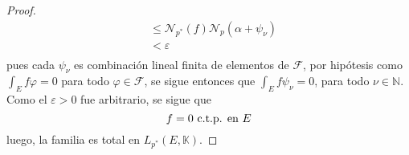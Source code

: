 \documentclass[12pt]{report}
\newcounter{it}
\theoremstyle{largebreak}
\newcommand{\N}[2]{\ensuremath{\mathcal{N}_{#1}\left(#2\right)}}
\begin{document}
\begin{proof}
\begin{equation*}
\begin{split}
                &\leq\N{p^*}{f}\N{p}{\alpha+\psi_\nu}\\
                &<\varepsilon\\
            \end{split}
        \end{equation*}
        pues cada $\psi_\nu$ es combinación lineal finita de elementos de $\mathcal{F}$, por hipótesis como $\int_E f\varphi=0$ para todo $\varphi\in\mathcal{F}$, se sigue entonces que $\int_E f\psi_\nu=0$, para todo $\nu\in\mathbb{N}$. Como el $\varepsilon>0$ fue arbitrario, se sigue que
        \begin{equation*}
            f=0\textup{ c.t.p. en }E
        \end{equation*}
        luego, la familia es total en $L_{p^*}(E,\mathbb{K})$.
    \end{proof}
\end{document}
